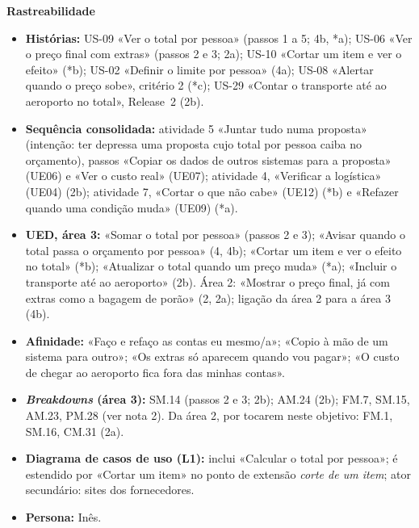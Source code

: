 \documentclass[11pt,a4paper]{article}
\newcommand{\reg}[1]{{\footnotesize\textcolor{pendente}{(#1)}}}
\newenvironment{usecase}[2]{%
  \par\medskip\noindent{\large\bfseries\color{roamly}#1: #2}\par\smallskip\small\noindent\ignorespaces}{\par\medskip}
\begin{document}
\begin{usecase}{UC-02}{Saber o total real por pessoa}
\textbf{Rastreabilidade}
\begin{itemize}
  \item \textbf{Histórias:} US-09 «Ver o total por pessoa» (passos 1 a 5; 4b, *a); US-06 «Ver o preço final com extras» (passos 2 e 3; 2a); US-10 «Cortar um item e ver o efeito» (*b); US-02 «Definir o limite por pessoa» (4a); US-08 «Alertar quando o preço sobe», critério 2 (*c); US-29 «Contar o transporte até ao aeroporto no total», Release~2 (2b).
  \item \textbf{Sequência consolidada:} atividade 5 «Juntar tudo numa proposta» (intenção: ter depressa uma proposta cujo total por pessoa caiba no orçamento), passos «Copiar os dados de outros sistemas para a proposta» \reg{UE06} e «Ver o custo real» \reg{UE07}; atividade 4, «Verificar a logística» \reg{UE04} (2b); atividade 7, «Cortar o que não cabe» \reg{UE12} (*b) e «Refazer quando uma condição muda» \reg{UE09} (*a).
  \item \textbf{UED, área 3:} «Somar o total por pessoa» (passos 2 e 3); «Avisar quando o total passa o orçamento por pessoa» (4, 4b); «Cortar um item e ver o efeito no total» (*b); «Atualizar o total quando um preço muda» (*a); «Incluir o transporte até ao aeroporto» (2b). Área 2: «Mostrar o preço final, já com extras como a bagagem de porão» (2, 2a); ligação da área 2 para a área 3 (4b).
  \item \textbf{Afinidade:} «Faço e refaço as contas eu mesmo/a»; «Copio à mão de um sistema para outro»; «Os extras só aparecem quando vou pagar»; «O custo de chegar ao aeroporto fica fora das minhas contas».
  \item \textbf{\textit{Breakdowns} (área 3):} SM.14 (passos 2 e 3; 2b); AM.24 (2b); FM.7, SM.15, AM.23, PM.28 (ver nota 2). Da área 2, por tocarem neste objetivo: FM.1, SM.16, CM.31 (2a).
  \item \textbf{Diagrama de casos de uso (L1):} inclui «Calcular o total por pessoa»; é estendido por «Cortar um item» no ponto de extensão \textit{corte de um item}; ator secundário: sites dos fornecedores.
  \item \textbf{Persona:} Inês.
\end{itemize}
\end{usecase}
\end{document}
